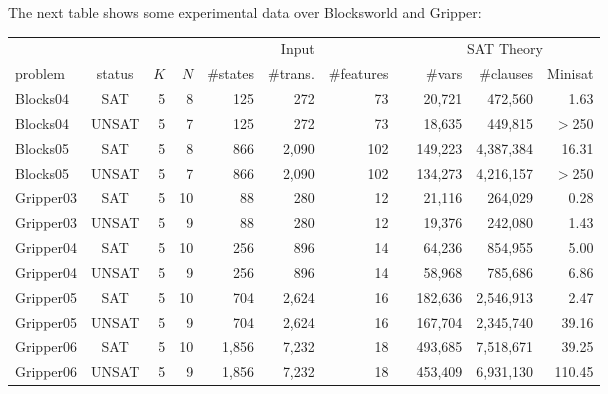 \documentclass[10pt]{article}
\begin{document}
\medskip\noindent
The next table shows some experimental data over Blocksworld and Gripper:
\begin{center}
  \begin{tabular}{lcrrrrrr@{}rrr}
    \toprule
              &        &     &     & \multicolumn{3}{c}{Input}        && \multicolumn{3}{c}{SAT Theory} \\
    \cmidrule{5-7}
    \cmidrule{9-11}
      problem & status & $K$ & $N$ & \#states & \#trans. & \#features && \#vars & \#clauses & Minisat \\
    \midrule
     Blocks04 &    SAT &   5 &   8 &      125 &      272 &         73 &&  20,721 &   472,560 &   1.63 \\
     Blocks04 &  UNSAT &   5 &   7 &      125 &      272 &         73 &&  18,635 &   449,815 & $>$250 \\

    \midrule
     Blocks05 &    SAT &   5 &   8 &      866 &    2,090 &        102 && 149,223 & 4,387,384 &  16.31 \\
     Blocks05 &  UNSAT &   5 &   7 &      866 &    2,090 &        102 && 134,273 & 4,216,157 & $>$250 \\

    \midrule
    Gripper03 &    SAT &   5 &  10 &       88 &      280 &         12 &&  21,116 &   264,029 &   0.28 \\
    Gripper03 &  UNSAT &   5 &   9 &       88 &      280 &         12 &&  19,376 &   242,080 &   1.43 \\

    \midrule
    Gripper04 &    SAT &   5 &  10 &      256 &      896 &         14 &&  64,236 &   854,955 &   5.00 \\
    Gripper04 &  UNSAT &   5 &   9 &      256 &      896 &         14 &&  58,968 &   785,686 &   6.86 \\

    \midrule
    Gripper05 &    SAT &   5 &  10 &      704 &    2,624 &         16 && 182,636 & 2,546,913 &   2.47 \\
    Gripper05 &  UNSAT &   5 &   9 &      704 &    2,624 &         16 && 167,704 & 2,345,740 &  39.16 \\

    \midrule
    Gripper06 &    SAT &   5 &  10 &    1,856 &    7,232 &         18 && 493,685 & 7,518,671 &  39.25 \\
    Gripper06 &  UNSAT &   5 &   9 &    1,856 &    7,232 &         18 && 453,409 & 6,931,130 & 110.45 \\

    \bottomrule
  \end{tabular}
\end{center}
\end{document}
